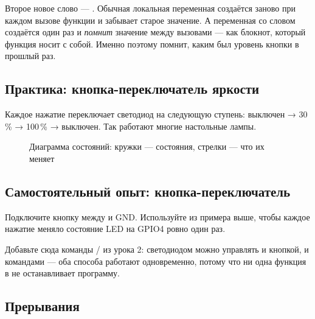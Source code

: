 Второе новое слово --- . Обычная локальная переменная создаётся заново при каждом вызове функции и
забывает старое значение. А переменная со словом  создаётся один раз и \emph{помнит} значение
между вызовами --- как блокнот, который функция носит с собой. Именно поэтому  помнит,
каким был уровень кнопки в прошлый раз.

\subsection{Практика: кнопка-переключатель яркости}

Каждое нажатие переключает светодиод на следующую ступень: выключен → 30\,\% → 100\,\% → выключен.
Так работают многие настольные лампы.

\begin{figure}[H]
\centering
{}
\caption{Диаграмма состояний: кружки --- состояния, стрелки --- что их меняет}
\end{figure}


\subsection{Самостоятельный опыт: кнопка-переключатель}

Подключите кнопку между  и GND. Используйте  из примера выше, чтобы
каждое нажатие меняло состояние LED на GPIO4 ровно один раз.

Добавьте сюда команды / из урока 2: светодиодом можно управлять и кнопкой, и командами --- оба способа работают одновременно,
потому что ни одна функция в  не останавливает программу.

\subsection{Прерывания}

